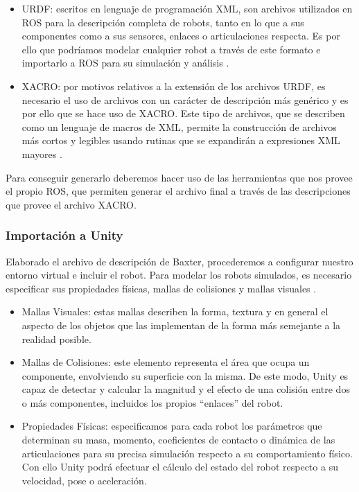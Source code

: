 \begin{itemize}
    \item URDF: escritos en lenguaje de programación XML, son archivos utilizados en ROS para la descripción completa de robots, tanto en lo que a sus componentes como a sus sensores, enlaces o articulaciones respecta. Es por ello que podríamos modelar cualquier robot a través de este formato e importarlo a ROS para su simulación y análisis \cite{65}.
    
    \item XACRO: por motivos relativos a la extensión de los archivos URDF, es necesario el uso de archivos con un carácter de descripción más genérico y es por ello que se hace uso de XACRO. Este tipo de archivos, que se describen como un lenguaje de macros de XML, permite la construcción de archivos más cortos y legibles usando rutinas que se expandirán a expresiones XML mayores \cite{66}.   
\end{itemize}

Para conseguir generarlo deberemos hacer uso de las herramientas que nos provee  
el propio ROS,  que permiten generar el archivo final a través de las descripciones que provee el archivo XACRO.

\subsubsection{Importación a Unity}
Elaborado el archivo de descripción de Baxter, procederemos a configurar nuestro entorno virtual e incluir el robot. Para modelar los robots simulados, es necesario especificar sus propiedades físicas, mallas de colisiones y mallas visuales \cite{67}.

\begin{itemize}
    \item Mallas Visuales: estas mallas describen la forma, textura y en general el aspecto de los objetos que las implementan de la forma más semejante a la realidad posible.
    
    \item Mallas de Colisiones: este elemento representa el área que ocupa un componente, envolviendo su superficie con la misma. De este modo, Unity es capaz de detectar y calcular la magnitud y el efecto de una colisión entre dos o más componentes, incluidos los propios “enlaces” del robot.
    
    \item Propiedades Físicas: especificamos para cada robot los parámetros que determinan su masa, momento, coeficientes de contacto o dinámica de las articulaciones para su precisa simulación respecto a su comportamiento físico. Con ello Unity podrá efectuar el cálculo del estado del robot respecto a su velocidad, pose o aceleración.
\end{itemize}

